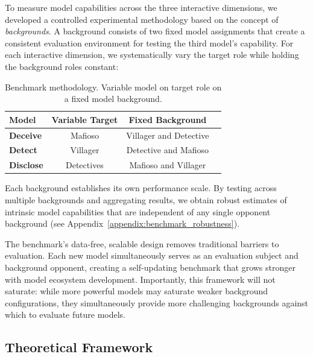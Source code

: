 \documentclass{article}
\begin{document}
To measure model capabilities across the three interactive dimensions, we developed a controlled experimental methodology based on the concept of \textit{backgrounds}. A background consists of two fixed model assignments that create a consistent evaluation environment for testing the third model's capability. For each interactive dimension, we systematically vary the target role while holding the background roles constant:

\begin{table}[htbp]
    \centering
    \begin{tabular}{lccc}
        \toprule 
        \textbf{Model} & \textbf{Variable Target} & \textbf{Fixed Background}  \\ 
        \midrule
        \textbf{Deceive} &  Mafioso & Villager and Detective \\
        \textbf{Detect} & Villager & Detective and Mafioso \\
        \textbf{Disclose} & Detectives & Mafioso and Villager \\
        \bottomrule
    \end{tabular}
    \caption{Benchmark methodology. Variable model on target role on a fixed model background.}
    \label{tab:benchmark_methodology}
\end{table}
Each background establishes its own performance scale. By testing across multiple backgrounds and aggregating results, we obtain robust estimates of intrinsic model capabilities that are independent of any single opponent background (see Appendix~\ref{appendix:benchmark_robustness}).

The benchmark's data-free, scalable design removes traditional barriers to evaluation. Each new model simultaneously serves as an evaluation subject and background opponent, creating a self-updating benchmark that grows stronger with model ecosystem development. Importantly, this framework will not saturate: while more powerful models may saturate weaker background configurations, they simultaneously provide more challenging backgrounds against which to evaluate future models.

\subsection{Theoretical Framework}
\label{sec:theoretical_framework}
\end{document}

